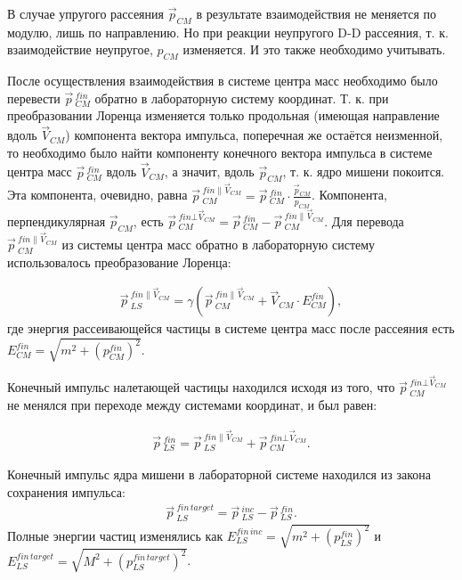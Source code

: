 \documentclass[a4paper,12pt]{article}
\begin{document}
\begin{large}
	В случае упругого рассеяния $\vec{p}_{CM}$ в результате взаимодействия не меняется по модулю, лишь по направлению.
	Но при реакции неупругого D-D рассеяния, т. к. взаимодействие неупругое, $p_{CM}$ изменяется.
	И это также необходимо учитывать. 
	
	После осуществления взаимодействия в системе центра масс необходимо было перевести $\vec{p}\,^{fin}_{CM}$ обратно в лабораторную систему координат.
	Т. к. при преобразовании Лоренца изменяется только продольная (имеющая направление вдоль $\vec{V}_{CM}$) компонента вектора импульса, поперечная же остаётся неизменной, то необходимо было найти компоненту конечного вектора импульса в системе центра масс $\vec{p}\,^{fin}_{CM}$ вдоль $\vec{V}_{CM}$, а значит, вдоль $\vec{p}_{CM}$, т. к. ядро мишени покоится.
	Эта компонента, очевидно, равна $\vec{p}\,^{fin \parallel \vec{V}_{CM}}_{CM}=\vec{p}\,^{fin}_{CM} \cdot \frac{\vec{p}_{CM}}{p_{CM}}$.
	Компонента, перпендикулярная $\vec{p}_{CM}$, есть $\vec{p}\,^{fin \bot \vec{V}_{CM}}_{CM}=\vec{p}\,^{fin}_{CM}-\vec{p}\,^{fin \parallel \vec{V}_{CM}}_{CM}$.
	Для перевода $\vec{p}\,^{fin \parallel \vec{V}_{CM}}_{CM}$ из системы центра масс обратно в лабораторную систему использовалось преобразование Лоренца:
	
\begin{equation}
\label{MSlsincMomentumAfter}
\begin{aligned} 
  \vec{p}\,_{LS}^{fin \parallel \vec{V}_{CM}} = \gamma \left( \vec{p}\,^{fin \parallel \vec{V}_{CM}}_{CM} + \vec{V}_{CM} \cdot E^{fin}_{CM} \right),
\end{aligned}
\end{equation}
	где энергия рассеивающейся частицы в системе центра масс после рассеяния есть $E^{fin}_{CM}=\sqrt{m^2+\left( p^{fin}_{CM} \right)^2}$.
	
	Конечный импульс налетающей частицы находился исходя из того, что $\vec{p}\,^{fin \bot \vec{V}_{CM}}_{CM}$ не менялся при переходе между системами координат, и был равен:
	
\begin{equation}
\label{LSincMomentumAfter}
\begin{aligned} 
  \vec{p}\,_{LS}^{fin} = \vec{p}\,_{LS}^{fin \parallel \vec{V}_{CM}} + \vec{p}\,^{fin \bot \vec{V}_{CM}}_{CM}.
\end{aligned}
\end{equation}	
	
	Конечный импульс ядра мишени в лабораторной системе находился из закона сохранения импульса:
\begin{equation}
\label{LStargetMomentumAfter}
\begin{aligned} 
  \vec{p}\,_{LS}^{fin\,target} = \vec{p}\,_{LS}^{inc} - \vec{p}\,_{LS}^{fin}.
\end{aligned}
\end{equation}
	Полные энергии частиц изменялись как $E_{LS}^{fin\,inc}=\sqrt{m^2+\left( p_{LS}^{fin} \right)^2 }$ и $E_{LS}^{fin\,target}=\sqrt{M^2+\left( p_{LS}^{fin\,target} \right)^2 }$.
  

\end{large}
\end{document}
